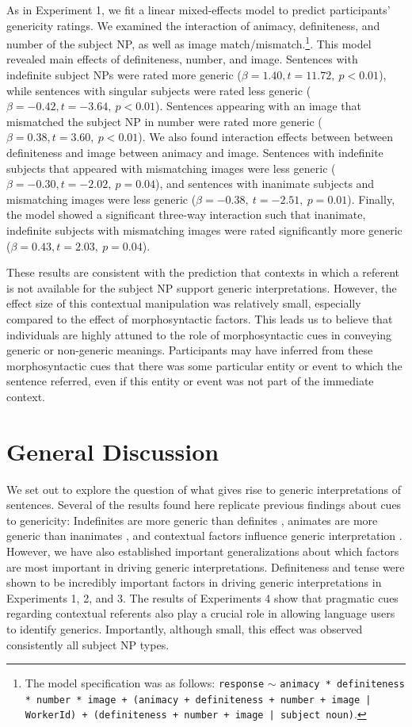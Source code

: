 \documentclass[10pt,letterpaper]{article}
\begin{document}
As in Experiment 1, we fit a linear mixed-effects model to predict participants' genericity ratings. We examined the interaction of animacy, definiteness, and number of the subject NP, as well as image match/mismatch.\footnote{The model specification was as follows: \texttt{response} \(\sim\) \texttt{animacy * definiteness * number * image + (animacy + definiteness + number + image | WorkerId) + (definiteness + number + image | subject noun)}.}. This model revealed main effects of definiteness, number, and image. Sentences with indefinite subject NPs were rated more generic (\(\beta = 1.40, t = 11.72,~p < 0.01\)), while sentences with singular subjects were rated less generic (\(\beta = -0.42, t = -3.64,~p < 0.01\)). Sentences appearing with an image that mismatched the subject NP in number were rated more generic (\(\beta = 0.38, t = 3.60,~p < 0.01\)). We also found interaction effects between between definiteness and image between animacy and image. Sentences with indefinite subjects that appeared with mismatching images were less generic (\(\beta = -0.30, t = -2.02,~p = 0.04\)), and sentences with inanimate subjects and mismatching images were less generic (\(\beta = -0.38,~t=-2.51,~p=0.01\)). Finally, the model showed a significant three-way interaction such that inanimate, indefinite subjects with mismatching images were rated significantly more generic (\(\beta = 0.43, t = 2.03,~p = 0.04\)).

These results are consistent with the prediction that contexts in which a referent is not available for the subject NP support generic interpretations. However, the effect size of this contextual manipulation was relatively small, especially compared to the effect of morphosyntactic factors. This leads us to believe that individuals are highly attuned to the role of morphosyntactic cues in conveying generic or non-generic meanings. Participants may have inferred from these morphosyntactic cues that there was some particular entity or event to which the sentence referred, even if this entity or event was not part of the immediate context.

\section{General Discussion}

We set out to explore the question of what gives rise to generic interpretations of sentences. Several of the results found here replicate previous findings about cues to genericity: Indefinites are more generic than definites \cite{Cimpian:2011, Gelman:2003}, animates are more generic than inanimates \cite{Brandone:2009}, and contextual factors influence generic interpretation \cite{Gelman:2003}. However, we have also established important generalizations about which factors are most important in driving generic interpretations. Definiteness and tense were shown to be incredibly important factors in driving generic interpretations in Experiments 1, 2, and 3. The results of Experiments 4 show that pragmatic cues regarding contextual referents also play a crucial role in allowing language users to identify generics. Importantly, although small, this effect was observed consistently all subject NP types.
\end{document}
